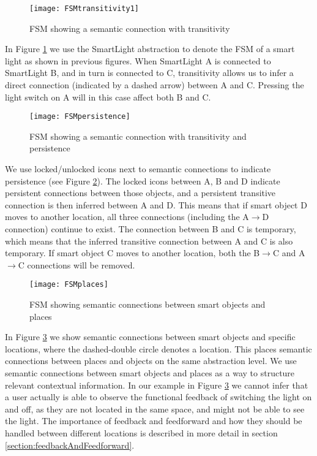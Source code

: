 \begin{figure}
\centerline{\texttt{[image: FSMtransitivity1]}}
\caption{FSM showing a semantic connection with transitivity}
\label{FSMtransitivity}
\end{figure}

In Figure \ref{FSMtransitivity} we use the SmartLight abstraction to denote the FSM of a smart light as shown in previous figures. When SmartLight A is connected to SmartLight B, and in turn is connected to C, transitivity allows us to infer a direct connection (indicated by a dashed arrow) between A and C. Pressing the light switch on A will in this case affect both B and C.

\begin{figure}
\centerline{\texttt{[image: FSMpersistence]}}
\caption{FSM showing a semantic connection with transitivity and persistence}
\label{FSMpersistence}
\end{figure}

We use locked/unlocked icons next to semantic connections to indicate persistence (see Figure \ref{FSMpersistence}). The locked icons between A, B and D indicate persistent connections between those objects, and a persistent transitive connection is then inferred between A and D. This means that if smart object D moves to another location, all three connections (including the A$\rightarrow$D connection) continue to exist. The connection between B and C is temporary, which means that the inferred transitive connection between A and C is also temporary. If smart object C moves to another location, both the B$\rightarrow$C and A$\rightarrow$C connections will be removed.

\begin{figure}
\centerline{\texttt{[image: FSMplaces]}}
\caption{FSM showing semantic connections between smart objects and places}
\label{FSMplaces}
\end{figure}

In Figure \ref{FSMplaces} we show semantic connections between smart objects and specific locations, where the dashed-double circle denotes a location. This places semantic connections between places and objects on the same abstraction level. We use semantic connections between smart objects and places as a way to structure relevant contextual information. In our example in Figure \ref{FSMplaces} we cannot infer that a user actually is able to observe the functional feedback of switching the light on and off, as they are not located in the same space, and might not be able to see the light. The importance of feedback and feedforward and how they should be handled between different locations is described in more detail in section \ref{section:feedbackAndFeedforward}.

